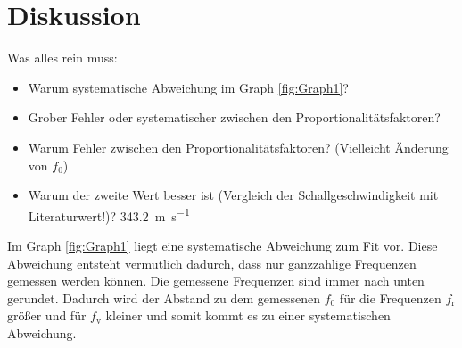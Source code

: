 
\section{Diskussion}
\label{sec:Diskussion}

Was alles rein muss:
\begin{itemize}
	\item Warum systematische Abweichung im Graph \ref{fig:Graph1}? 
	\item Grober Fehler oder systematischer zwischen den Proportionalitätsfaktoren?
	\item Warum Fehler zwischen den Proportionalitätsfaktoren? (Vielleicht Änderung von $f_0$)
	\item Warum der zweite Wert besser ist (Vergleich der Schallgeschwindigkeit mit Literaturwert!)? \SI{343.2}{\meter\per\second} \cite{c}
	
\end{itemize}

Im Graph \ref{fig:Graph1} liegt eine systematische Abweichung zum Fit vor. Diese Abweichung entsteht vermutlich dadurch, dass nur ganzzahlige Frequenzen gemessen werden können. Die gemessene Frequenzen sind immer nach unten gerundet. Dadurch wird der Abstand zu dem gemessenen $f_0$ für die Frequenzen $f_\text{r}$ größer und für $f_\text{v}$ kleiner und somit kommt es zu einer systematischen Abweichung.



